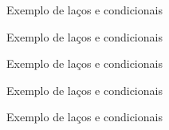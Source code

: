 \begin{frame}[fragile]{Exemplo de laços e condicionais}
\end{frame}

\begin{frame}[fragile]{Exemplo de laços e condicionais}
\end{frame}

\begin{frame}[fragile]{Exemplo de laços e condicionais}
\end{frame}

\begin{frame}[fragile]{Exemplo de laços e condicionais}
\end{frame}
\begin{frame}[fragile]{Exemplo de laços e condicionais}
\end{frame}
